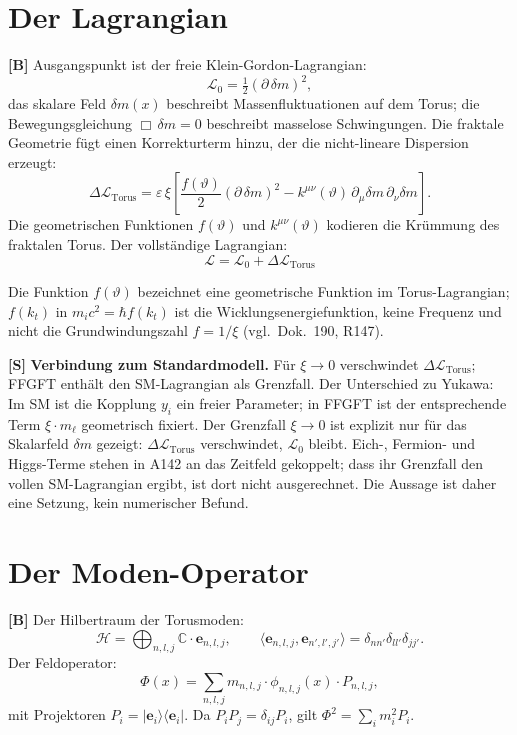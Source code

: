 \section{Der Lagrangian}

\textbf{[B]} Ausgangspunkt ist der freie Klein-Gordon-Lagrangian:
\[
  \mathcal L_0 = \tfrac12(\partial\,\delta m)^2,
\]
das skalare Feld $\delta m(x)$ beschreibt Massenfluktuationen auf dem Torus;
die Bewegungsgleichung $\Box\,\delta m=0$ beschreibt masselose Schwingungen. Die
fraktale Geometrie fügt einen Korrekturterm hinzu, der die nicht-lineare
Dispersion erzeugt:
\[
  \Delta\mathcal L_{\text{Torus}}
  = \varepsilon\,\xi\!\left[
    \frac{f(\vartheta)}{2}(\partial\,\delta m)^2
    -k^{\mu\nu}(\vartheta)\,\partial_\mu\delta m\,\partial_\nu\delta m
  \right].
\]
Die geometrischen Funktionen $f(\vartheta)$ und $k^{\mu\nu}(\vartheta)$
kodieren die Krümmung des fraktalen Torus. Der vollständige Lagrangian:
\[
  \boxed{\;\mathcal L = \mathcal L_0 + \Delta\mathcal L_{\text{Torus}}\;}
\]

Die Funktion $f(\vartheta)$ bezeichnet eine geometrische Funktion im Torus-Lagrangian; $f(k_t)$ in $m_ic^2 = \hbar f(k_t)$ ist die Wicklungsenergiefunktion, keine Frequenz und nicht die Grundwindungszahl $f = 1/\xi$ (vgl.\ Dok.~190, R147).

\textbf{[S]} \textbf{Verbindung zum Standardmodell.} Für $\xi\to0$ verschwindet
$\Delta\mathcal L_{\text{Torus}}$; FFGFT enthält den SM-Lagrangian als Grenzfall.
Der Unterschied zu Yukawa: Im SM ist die Kopplung $y_i$ ein freier Parameter;
in FFGFT ist der entsprechende Term $\xi\cdot m_\ell$ geometrisch fixiert.
Der Grenzfall $\xi\to0$ ist explizit nur für das Skalarfeld $\delta m$ gezeigt: $\Delta\mathcal L_{\text{Torus}}$ verschwindet, $\mathcal L_0$ bleibt. Eich-, Fermion- und Higgs-Terme stehen in A142 an das Zeitfeld gekoppelt; dass ihr Grenzfall den vollen SM-Lagrangian ergibt, ist dort nicht ausgerechnet. Die Aussage ist daher eine Setzung, kein numerischer Befund.

\section{Der Moden-Operator}

\textbf{[B]} Der Hilbertraum der Torusmoden:
\[
  \mathcal H = \bigoplus_{n,l,j}\mathbb C\cdot\mathbf e_{n,l,j},
  \qquad
  \langle\mathbf e_{n,l,j},\mathbf e_{n',l',j'}\rangle = \delta_{nn'}\delta_{ll'}\delta_{jj'}.
\]
Der Feldoperator:
\[
  \Phi(x) = \sum_{n,l,j} m_{n,l,j}\cdot\phi_{n,l,j}(x)\cdot P_{n,l,j},
\]
mit Projektoren $P_i=|\mathbf e_i\rangle\langle\mathbf e_i|$. Da
$P_iP_j=\delta_{ij}P_i$, gilt $\Phi^2=\sum_i m_i^2 P_i$.

